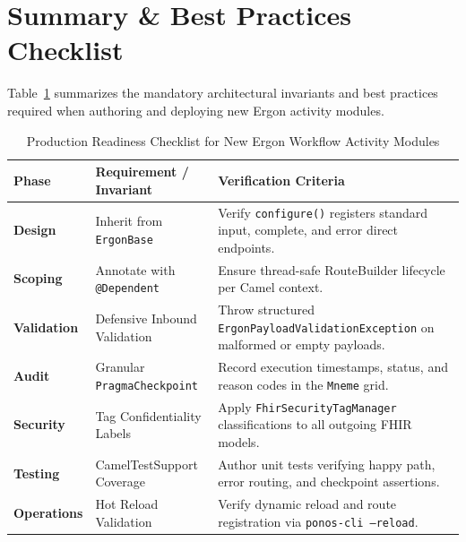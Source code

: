 \section{Summary \& Best Practices Checklist}
\label{sec:ergon_checklist}

Table~\ref{tab:ergon_checklist} summarizes the mandatory architectural invariants and best practices required when authoring and deploying new Ergon activity modules.

\begin{table}[htbp]
\centering
\small
\begin{tabularx}{\textwidth}{l p{4.5cm} X}
\toprule
\textbf{Phase} & \textbf{Requirement / Invariant} & \textbf{Verification Criteria} \\
\midrule
\textbf{Design} & Inherit from \texttt{ErgonBase} & Verify \texttt{configure()} registers standard input, complete, and error direct endpoints. \\
\textbf{Scoping} & Annotate with \texttt{@Dependent} & Ensure thread-safe RouteBuilder lifecycle per Camel context. \\
\textbf{Validation} & Defensive Inbound Validation & Throw structured \texttt{ErgonPayloadValidationException} on malformed or empty payloads. \\
\textbf{Audit} & Granular \texttt{PragmaCheckpoint} & Record execution timestamps, status, and reason codes in the \texttt{Mneme} grid. \\
\textbf{Security} & Tag Confidentiality Labels & Apply \texttt{FhirSecurityTagManager} classifications to all outgoing FHIR models. \\
\textbf{Testing} & CamelTestSupport Coverage & Author unit tests verifying happy path, error routing, and checkpoint assertions. \\
\textbf{Operations} & Hot Reload Validation & Verify dynamic reload and route registration via \texttt{ponos-cli --reload}. \\
\bottomrule
\end{tabularx}
\caption{Production Readiness Checklist for New Ergon Workflow Activity Modules}
\label{tab:ergon_checklist}
\end{table}
